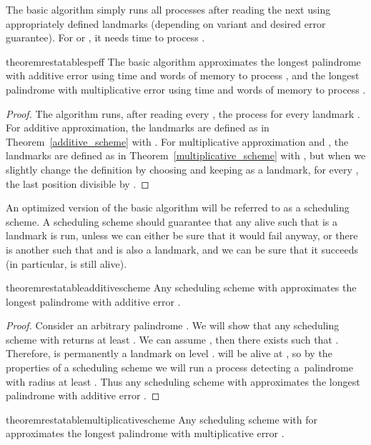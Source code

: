\documentclass{article}[11pt,letter]
\begin{document}
The basic algorithm simply runs all processes after reading the next  using appropriately defined landmarks (depending on variant
and desired error guarantee).
For  or , it needs  time to process .


\begin{restatable}{theorem}{restatablespeff}
\label{th:sp_eff}
The basic algorithm approximates the longest palindrome with additive error  using  time and words of memory
to process , and the longest palindrome with multiplicative error  using 
time and words of memory to process .
\end{restatable}

\begin{proof}
The algorithm runs, after reading every , the process  for every landmark .
For additive approximation, the landmarks are defined as in Theorem~\ref{additive_scheme} with .
For multiplicative approximation and ,
the landmarks are defined as in Theorem~\ref{multiplicative_scheme} with ,
but when  we slightly change the definition by choosing  and keeping as a landmark,
for every , the last position divisible by .
\end{proof}

An optimized version of the basic algorithm will be referred
to as a scheduling scheme. A scheduling scheme should guarantee that any alive  such that  is a landmark is run, unless we 
can either be sure that it would fail anyway, or there is another  such that  and  is also a landmark, and we can be sure
that it succeeds (in particular,  is still alive).

\begin{restatable}{theorem}{restatableadditivescheme}
\label{additive_scheme}
Any scheduling scheme with  approximates the longest palindrome with additive error
.
\end{restatable}


\begin{proof}
Consider an arbitrary palindrome . We will show that any scheduling scheme with  returns at least .
We can assume , then there exists  such that .
Therefore,  is permanently a landmark on level .  will be alive at , so by the properties of a scheduling
scheme we will run a process detecting a~palindrome with radius at least .
Thus any scheduling scheme with  approximates the longest palindrome with additive error .
\end{proof}

\begin{restatable}{theorem}{restatablemultiplicativescheme}
\label{multiplicative_scheme}
Any scheduling scheme with  for  approximates the longest palindrome with multiplicative 
error .
\end{restatable}
\end{document}
